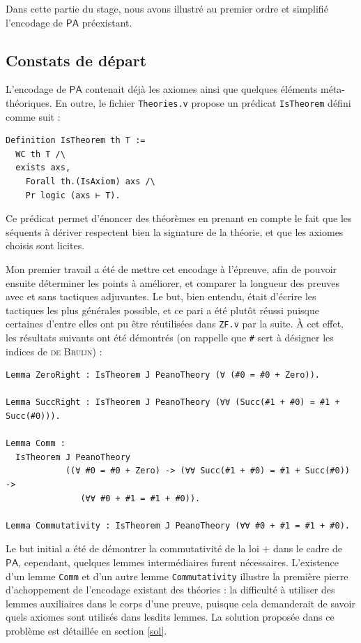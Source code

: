 \documentclass[a4paper]{article}
\newcommand{\PA}{\mathsf{PA}}
\begin{document}
Dans cette partie du stage, nous avons illustré au premier ordre et simplifié l'encodage de $\PA$ préexistant.

\subsection{Constats de départ}

L'encodage de $\PA$ contenait déjà les axiomes ainsi que quelques éléments méta-théoriques. En outre, le fichier \verb+Theories.v+ propose un prédicat \verb+IsTheorem+ défini comme suit :
\begin{verbatim}
Definition IsTheorem th T :=
  WC th T /\
  exists axs,
    Forall th.(IsAxiom) axs /\
    Pr logic (axs ⊢ T).
\end{verbatim}
Ce prédicat permet d'énoncer des théorèmes en prenant en compte le fait que les séquents à dériver respectent bien la signature de la théorie, et que les axiomes choisis sont licites.

Mon premier travail a été de mettre cet encodage à l'épreuve, afin de pouvoir ensuite déterminer les points à améliorer, et comparer la longueur des preuves avec et sans tactiques adjuvantes. Le but, bien entendu, était d'écrire les tactiques les plus générales possible, et ce pari a été plutôt réussi puisque certaines d'entre elles ont pu être réutilisées dans \verb+ZF.v+ par la suite. \`A cet effet, les résultats suivants ont été démontrés (on rappelle que \verb+#+ sert à désigner les indices de \textsc{de Bruijn}) :
\begin{verbatim}
Lemma ZeroRight : IsTheorem J PeanoTheory (∀ (#0 = #0 + Zero)).

Lemma SuccRight : IsTheorem J PeanoTheory (∀∀ (Succ(#1 + #0) = #1 + Succ(#0))).

Lemma Comm :
  IsTheorem J PeanoTheory
            ((∀ #0 = #0 + Zero) -> (∀∀ Succ(#1 + #0) = #1 + Succ(#0)) ->
               (∀∀ #0 + #1 = #1 + #0)).

Lemma Commutativity : IsTheorem J PeanoTheory (∀∀ #0 + #1 = #1 + #0).
\end{verbatim}
Le but initial a été de démontrer la commutativité de la loi $+$ dans le cadre de $\PA$, cependant, quelques lemmes intermédiaires furent nécessaires. L'existence d'un lemme \verb+Comm+ et d'un autre lemme \verb+Commutativity+ illustre la première pierre d'achoppement de l'encodage existant des théories : la difficulté à utiliser des lemmes auxiliaires dans le corps d'une preuve, puisque cela demanderait de savoir quels axiomes sont utilisés dans lesdits lemmes. La solution proposée dans ce problème est détaillée en section \ref{sol}.
\end{document}
